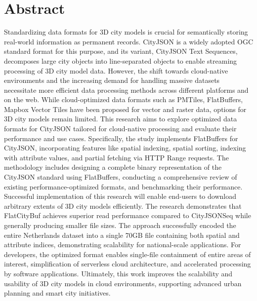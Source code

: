 
\chapter*{Abstract}
Standardizing data formats for 3D city models is crucial for semantically storing real-world information as permanent records.
CityJSON is a widely adopted OGC standard format for this purpose, and its variant, CityJSON Text Sequences, decomposes large city objects into line-separated objects to enable streaming processing of 3D city model data.
However, the shift towards cloud-native environments and the increasing demand for handling massive datasets necessitate more efficient data processing methods across different platforms and on the web.
While cloud-optimized data formats such as PMTiles, FlatBuffers, Mapbox Vector Tiles have been proposed for vector and raster data, options for 3D city models remain limited.
This research aims to explore optimized data formats for CityJSON tailored for cloud-native processing and evaluate their performance and use cases.
Specifically, the study implements FlatBuffers for CityJSON, incorporating features like spatial indexing, spatial sorting, indexing with attribute values, and partial fetching via HTTP Range requests.
The methodology includes designing a complete binary representation of the CityJSON standard using FlatBuffers, conducting a comprehensive review of existing performance-optimized formats, and benchmarking their performance.
Successful implementation of this research will enable end-users to download arbitrary extents of 3D city models efficiently.
The research demonstrates that FlatCityBuf achieves superior read performance compared to CityJSONSeq while generally producing smaller file sizes.
The approach successfully encoded the entire Netherlands dataset into a single 70GB file containing both spatial and attribute indices, demonstrating scalability for national-scale applications.
For developers, the optimized format enables single-file containment of entire areas of interest, simplification of serverless cloud architecture, and accelerated processing by software applications.
Ultimately, this work improves the scalability and usability of 3D city models in cloud environments, supporting advanced urban planning and smart city initiatives.